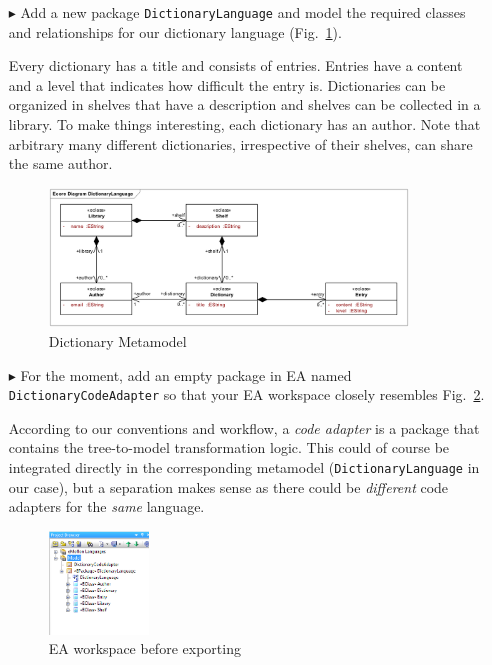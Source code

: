 \begin{enumerate}

\item[$\blacktriangleright$] Add a new package \texttt{DictionaryLanguage} and model the required classes and relationships for our dictionary language (Fig.~\ref{fig:moca-5-DictionaryMM}).

Every dictionary has a title and consists of entries.
Entries have a content and a level that indicates how difficult the entry is.
Dictionaries can be organized in shelves that have a description and shelves can be collected in a library.
To make things interesting, each dictionary has an author.
Note that arbitrary many different dictionaries, irrespective of their shelves, can share the same author.

\begin{figure}[!htbp]
\begin{center}
 \includegraphics[width=0.9\textwidth]{pics/moca/1DictionaryMetaModel/DictionaryLanguage}
  \caption{Dictionary Metamodel}
  \label{fig:moca-5-DictionaryMM}
\end{center}
\end{figure}

\item[$\blacktriangleright$] For the moment, add an empty package in EA named \texttt{Dic\-tion\-ary\-Code\-Adapter} so that your EA workspace closely resembles Fig.~\ref{fig:moca-5-DictionaryMM-ProjectBrowser}.

According to our conventions and workflow, a \emph{code adapter} is a package that contains the tree-to-model transformation logic.
This could of course be integrated directly in the corresponding metamodel (\texttt{Dic\-tion\-ary\-Language} in our case), but a separation makes sense as there could be \emph{different} code adapters for the \emph{same} language.


\begin{figure}[!htbp]
\begin{center}
 \includegraphics[width=0.25\textwidth]{pics/moca/1DictionaryMetaModel/5-DictionaryMM-ProjectBrowser}
  \caption{EA workspace before exporting}
  \label{fig:moca-5-DictionaryMM-ProjectBrowser}
\end{center}
\end{figure}


\end{enumerate}
